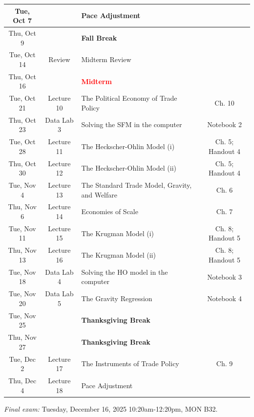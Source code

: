 \documentclass[11pt]{article}
\begin{document}
\begin{center}
\begin{tabular}{|c|c|l|c|}
        Tue, Oct 7 &  & Pace Adjustment &   \\ \hline

        Thu, Oct 9 &  & \textbf{Fall Break} & \\ \hline
        
        Tue, Oct 14 & Review & Midterm Review  &   \\ \hline
        Thu, Oct 16 &  & \textcolor{red}{\textbf{Midterm}} &   \\ \hline
		
        Tue, Oct 21 & Lecture 10 & The Political Economy of Trade Policy &  Ch. 10 \\ \hline

        Thu, Oct 23 &Data Lab 3 & Solving the SFM in the computer & Notebook 2 \\ \hline

        Tue,  Oct 28 &Lecture 11 & The Heckscher-Ohlin Model (i)  & Ch. 5; Handout 4  \\ \hline

        Thu, Oct 30 &  Lecture 12 & The Heckscher-Ohlin Model (ii) & Ch. 5; Handout 4  \\ \hline 

        Tue, Nov 4 & Lecture 13 & The Standard Trade Model, Gravity, and Welfare   &  Ch. 6   \\ \hline
        
        Thu, Nov 6 & Lecture 14 & Economies of Scale & Ch. 7   \\ \hline

        Tue, Nov 11 & Lecture 15 & The Krugman Model (i) & Ch. 8; Handout 5 \\  \hline

        Thu, Nov 13 &Lecture 16 & The Krugman Model (ii)   & Ch. 8; Handout 5   \\ \hline

        Tue, Nov 18 &  Data Lab 4 & Solving the HO model in the computer & Notebook 3 \\ \hline

        Tue, Nov 20 & Data Lab 5 & The Gravity Regression & Notebook 4 \\  \hline

        Tue, Nov 25 &  & \textbf{Thanksgiving Break} &   \\  \hline

        Thu, Nov 27 &   & \textbf{Thanksgiving Break}    &    \\ \hline

        Tue, Dec 2 & Lecture 17 & The Instruments of Trade Policy & Ch. 9 \\  \hline

        Thu, Dec 4 &  Lecture 18 & Pace Adjustment &    \\ \hline
\end{tabular}
\end{center}

\smallskip
\noindent \textit{Final exam:} Tuesday, December 16, 2025 10:20am-12:20pm, MON	B32.
\end{document}

